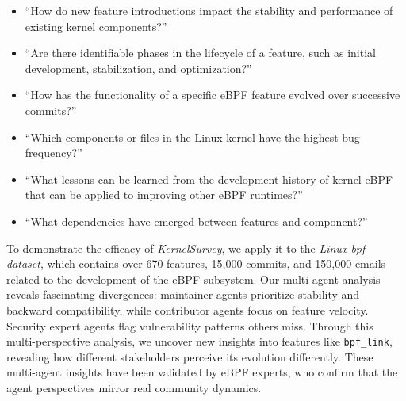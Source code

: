 \documentclass[sigconf,review,anonymous]{acmart}
\newcommand{\sys}{\textit{KernelSurvey}\xspace}
\begin{document}
\begin{itemize}
    \item ``How do new feature introductions impact the stability and performance of existing kernel components?''
    \item ``Are there identifiable phases in the lifecycle of a feature, such as initial development, stabilization, and optimization?''
    \item ``How has the functionality of a specific eBPF feature evolved over successive commits?''
    \item ``Which components or files in the Linux kernel have the highest bug frequency?''
    \item ``What lessons can be learned from the development history of kernel eBPF that can be applied to improving other eBPF runtimes?''
    \item ``What dependencies have emerged between features and component?''
\end{itemize}

To demonstrate the efficacy of \sys, we apply it to the \textit{Linux-bpf dataset}, which contains over 670 features, 15,000 commits, and 150,000 emails related to the development of the eBPF subsystem. Our multi-agent analysis reveals fascinating divergences: maintainer agents prioritize stability and backward compatibility, while contributor agents focus on feature velocity. Security expert agents flag vulnerability patterns others miss. Through this multi-perspective analysis, we uncover new insights into features like \texttt{bpf\_link}, revealing how different stakeholders perceive its evolution differently. These multi-agent insights have been validated by eBPF experts, who confirm that the agent perspectives mirror real community dynamics.
\end{document}
